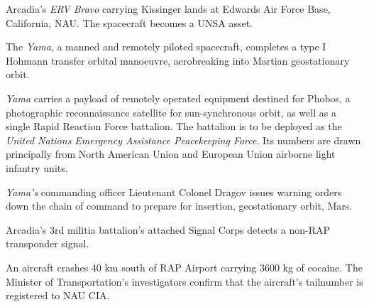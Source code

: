 Arcadia's {\it ERV Bravo} carrying Kissinger lands at Edwards Air Force Base, California, NAU. The spacecraft becomes a UNSA asset.
\StopTimelineDate

The {\it Yama}, a manned and remotely piloted spacecraft, completes a type I Hohmann transfer orbital manoeuvre, aerobreaking into Martian geostationary orbit. 

{\it Yama} carries a payload of remotely operated equipment destined for Phobos, a photographic reconnaissance satellite for sun-synchronous orbit, as well as a single Rapid Reaction Force battalion. The battalion is to be deployed as the {\it United Nations Emergency Assistance Peacekeeping Force}. Its numbers are drawn principally from North American Union and European Union airborne light infantry units.
\StopTimelineDate

{\it Yama's} commanding officer Lieutenant Colonel Dragov issues warning orders down the chain of command to prepare for insertion, geostationary orbit, Mars.
\StopTimelineDate

Arcadia's 3rd militia battalion's attached Signal Corps detects a non-RAP transponder signal.
\StopTimelineDate

An aircraft crashes 40 km south of RAP Airport carrying 3600 kg of cocaine. The Minister of Transportation's investigators confirm that the aircraft's tailnumber is registered to NAU CIA.
\StopTimelineDate

\stoplines

\StopChapter

